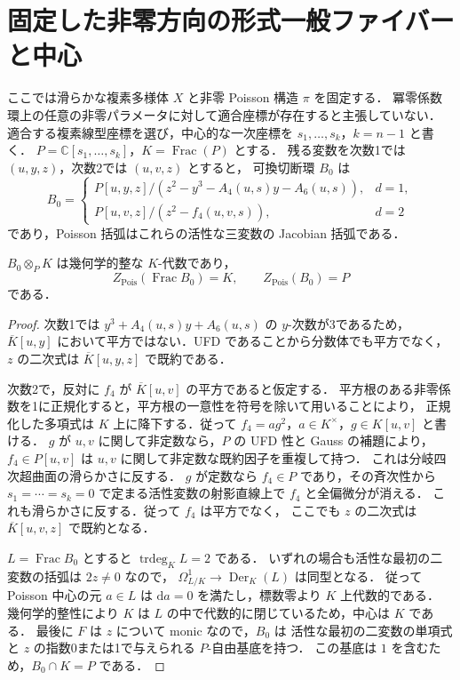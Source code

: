 \section{固定した非零方向の形式一般ファイバーと中心}
\label{subsec:formal-generic-center}

ここでは滑らかな複素多様体 $X$ と非零 Poisson 構造 $\pi$ を固定する．
冪零係数環上の任意の非零パラメータに対して適合座標が存在すると主張していない．
適合する複素線型座標を選び，中心的な一次座標を
$s_1,\ldots,s_k$，$k=n-1$ と書く．
$P=\mathbb C[s_1,\ldots,s_k]$，$K=\operatorname{Frac}(P)$ とする．
残る変数を次数1では $(u,y,z)$，次数2では $(u,v,z)$ とすると，
可換切断環 $B_0$ は
\[
 B_0=\begin{cases}
 P[u,y,z]/(z^2-y^3-A_4(u,s)y-A_6(u,s)),&d=1,\\
 P[u,v,z]/(z^2-f_4(u,v,s)),&d=2
 \end{cases}
\]
であり，Poisson 括弧はこれらの活性な三変数の Jacobian 括弧である．

\begin{lemma}[古典切断環の中心]
\label{lem:classical-casimir-center}
$B_0\otimes_PK$ は幾何学的整な $K$-代数であり，
\[
 Z_{\mathrm{Pois}}(\operatorname{Frac}B_0)=K,
 \qquad Z_{\mathrm{Pois}}(B_0)=P
\]
である．
\end{lemma}
\begin{proof}
次数1では $y^3+A_4(u,s)y+A_6(u,s)$ の $y$-次数が3であるため，
$\overline K[u,y]$ において平方ではない．UFD であることから分数体でも平方でなく，
$z$ の二次式は $\overline K[u,y,z]$ で既約である．

次数2で，反対に $f_4$ が $\overline K[u,v]$ の平方であると仮定する．
平方根のある非零係数を1に正規化すると，平方根の一意性を符号を除いて用いることにより，
正規化した多項式は $K$ 上に降下する．従って
$f_4=a g^2$，$a\in K^\times$，$g\in K[u,v]$ と書ける．
$g$ が $u,v$ に関して非定数なら，$P$ の UFD 性と Gauss の補題により，
$f_4\in P[u,v]$ は $u,v$ に関して非定数な既約因子を重複して持つ．
これは分岐四次超曲面の滑らかさに反する．
$g$ が定数なら $f_4\in P$ であり，その斉次性から
$s_1=\cdots=s_k=0$ で定まる活性変数の射影直線上で $f_4$ と全偏微分が消える．
これも滑らかさに反する．従って $f_4$ は平方でなく，
ここでも $z$ の二次式は $\overline K[u,v,z]$ で既約となる．

$L=\operatorname{Frac}B_0$ とすると $\operatorname{trdeg}_K L=2$ である．
いずれの場合も活性な最初の二変数の括弧は $2z\ne0$ なので，
$\Omega^1_{L/K}\to\operatorname{Der}_K(L)$ は同型となる．
従って Poisson 中心の元 $a\in L$ は $\mathrm da=0$ を満たし，標数零より $K$ 上代数的である．
幾何学的整性により $K$ は $L$ の中で代数的に閉じているため，中心は $K$ である．
最後に $F$ は $z$ について monic なので，$B_0$ は
活性な最初の二変数の単項式と $z$ の指数0または1で与えられる $P$-自由基底を持つ．
この基底は $1$ を含むため，$B_0\cap K=P$ である．
\end{proof}

